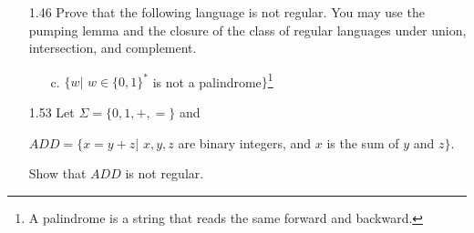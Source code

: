 \documentclass[]{book}
\theoremstyle{definition}
\begin{document}
\begin{enumerate}
\begin{enumerate}
    \end{enumerate}

\item[1.46] Prove that the following language is not regular.  You may use the pumping lemma and the closure of the class of regular languages under union, intersection, and complement.

    \begin{enumerate}
        \item[c.] $\{w|$ $w \in \{0,1\}^*$ is not a palindrome$\}$\footnote{A palindrome is a string that reads the same forward and backward.}
    \end{enumerate}
    
\item[1.53] Let $\Sigma = \{0,1,+,=\}$ and 

$ADD = \{x=y+z|$ $x,y,z$ are binary integers, and $x$ is the sum of $y$ and $z\}$.

Show that $ADD$ is not regular.

\end{enumerate}
\end{document}
